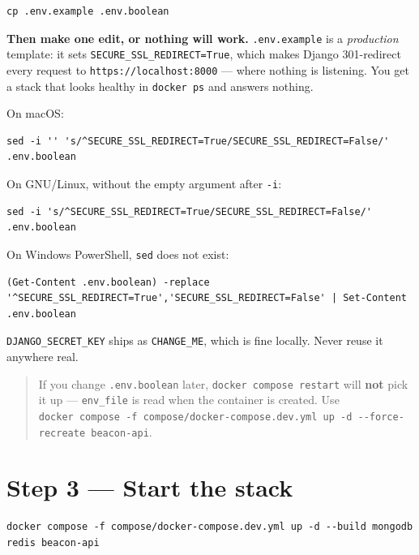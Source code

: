 \documentclass[
  10pt,
]{article}
\begin{document}
\begin{verbatim}
cp .env.example .env.boolean
\end{verbatim}

\textbf{Then make one edit, or nothing will work.} \texttt{.env.example}
is a \emph{production} template: it sets
\texttt{SECURE\_SSL\_REDIRECT=True}, which makes Django 301-redirect
every request to \texttt{https://localhost:8000} --- where nothing is
listening. You get a stack that looks healthy in \texttt{docker\ ps} and
answers nothing.

On macOS:

\begin{verbatim}
sed -i '' 's/^SECURE_SSL_REDIRECT=True/SECURE_SSL_REDIRECT=False/' .env.boolean
\end{verbatim}

On GNU/Linux, without the empty argument after \texttt{-i}:

\begin{verbatim}
sed -i 's/^SECURE_SSL_REDIRECT=True/SECURE_SSL_REDIRECT=False/' .env.boolean
\end{verbatim}

On Windows PowerShell, \texttt{sed} does not exist:

\begin{verbatim}
(Get-Content .env.boolean) -replace '^SECURE_SSL_REDIRECT=True','SECURE_SSL_REDIRECT=False' | Set-Content .env.boolean
\end{verbatim}

\texttt{DJANGO\_SECRET\_KEY} ships as \texttt{CHANGE\_ME}, which is fine
locally. Never reuse it anywhere real.

\begin{quote}
If you change \texttt{.env.boolean} later,
\texttt{docker\ compose\ restart} will \textbf{not} pick it up ---
\texttt{env\_file} is read when the container is created. Use
\texttt{docker\ compose\ -f\ compose/docker-compose.dev.yml\ up\ -d\ -\/-force-recreate\ beacon-api}.
\end{quote}

\section{Step 3 --- Start the stack}\label{step-3-start-the-stack}

\begin{verbatim}
docker compose -f compose/docker-compose.dev.yml up -d --build mongodb redis beacon-api
\end{verbatim}
\end{document}
